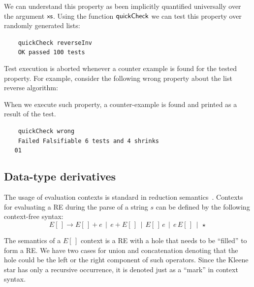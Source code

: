 \documentclass[oneside,12pt]{scrbook}
\def\resethooks{%
	\global\let\SaveRestoreHook\empty
	\global\let\ColumnHook\empty}
\let\hspre\empty
\let\hspost\empty
\theoremstyle{definition}
\newcommand{\D}[1]{\blue{\mathsf{#1}}}
\newcommand{\F}[1]{\green{\mathsf{#1}}}
\newcommand{\V}[1]{\black{\mathsf{#1}}}
\theoremstyle{plain}
\theoremstyle{definition}
\begin{document}
We can understand this property as been implicitly quantified universally over the argument \ensuremath{\V{xs}}.
Using the function \ensuremath{\F{quickCheck}} we can test this property over randomly generated lists:
\begin{tabbing}\tt
	~~~quickCheck~reverseInv\\
	\tt ~~~~OK~passed~100~tests
\end{tabbing}
Test execution is aborted whenever a counter example is found for the tested property. For example,
consider the following wrong property about the list reverse algorithm:
\resethooks
When we execute such property, a counter-example is found and printed as a result of the test.
\begin{tabbing}\tt
	~~~quickCheck~wrong\\
	\tt ~~~~Failed~Falsifiable~6~tests~and~4~shrinks\\
	\tt ~~~01
\end{tabbing}

\subsection{Data-type derivatives}
\label{subsection:datatypederivatives}

The usage of evaluation contexts is standard in reduction semantics~\cite{Felleisen2009}.
Contexts for evaluating a RE during the parse of a string $s$ can be defined by the following
context-free syntax:
\[E[\,] \to E[\,]+ e\,\mid\,e + E[\,]\,\mid\,E[\,]\,e\,\mid\,e\,E[\,]\,\mid\,\star\]

The semantics of a $E[\,]$ context is a RE with a hole that needs to be ``filled'' to form a
RE. We have two cases for union and concatenation denoting that the hole could be the left
or the right component of such operators. Since the Kleene star has only a recursive occurrence,
it is denoted just as a ``mark'' in context syntax.
\end{document}
